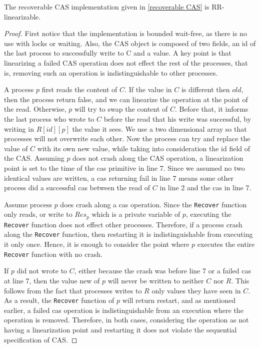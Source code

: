 \begin{claim}
	The recoverable CAS implementation given in \ref{recoverable CAS} is RR-linearizable.
\end{claim}

\begin{proof}
	First notice that the implementation is bounded wait-free, as there is no use with locks or waiting. Also, the CAS object is composed of two fields, an id of the last process to successfully write to C and a value. A key point is that linearizing a failed CAS operation does not effect the rest of the processes, that is, removing such an operation is indistinguishable to other processes.
	
	A process $p$ first reads the content of $C$. If the value in $C$ is different then $old$, then the process return false, and we can linearize the operation at the point of the read. Otherwise, $p$ will try to swap the content of $C$. Before that, it informs the last process who wrote to $C$ before the read that his write was successful, by writing in $R[id][p]$ the value it sees. We use a two dimensional array so that processes will not overwrite each other. Now the process can try and replace the value of $C$ with its own new value, while taking into consideration the id field of the CAS. Assuming $p$ does not crash along the CAS operation, a linearization point is set to the time of the cas primitive in line 7. Since we assumed no two identical values are written, a cas returning fail in line 7 means some other process did a successful cas between the read of $C$ in line 2 and the cas in line 7.
	 
	Assume process $p$ does crash along a cas operation. Since the \texttt{Recover} function only reads, or write to $Res_p$ which is a private variable of $p$, executing the \texttt{Recover} function does not effect other processes. Therefore, if a process crash along the \texttt{Recover} function, then restarting it is indistinguishable from executing it only once. Hence, it is enough to consider the point where $p$ executes the entire \texttt{Recover} function with no crash.
	
	If $p$ did not wrote to $C$, either because the crash was before line 7 or a failed cas at line 7, then the value new of $p$ will never be written to neither $C$ nor $R$. This follows from the fact that processes writes to $R$ only values they have seen in $C$. As a result, the \texttt{Recover} function of $p$ will return restart, and as mentioned earlier, a failed cas operation is indistinguishable from an execution where the operation is removed. Therefore, in both cases, considering the operation as not having a linearization point and restarting it does not violate the sequential specification of CAS.
	

\end{proof}

